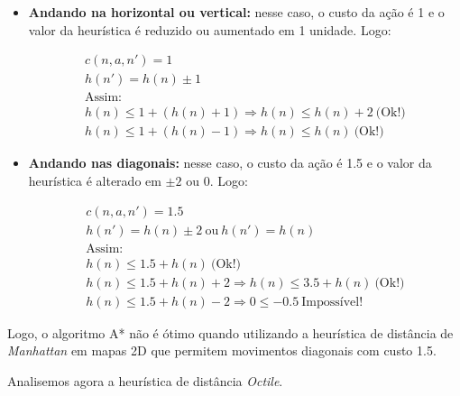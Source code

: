 \documentclass[12pt]{article}
\begin{document}
\begin{itemize}
	\item \textbf{Andando na horizontal ou vertical:} nesse caso, o custo da ação é 1 e o valor da heurística é reduzido ou aumentado em 1 unidade. Logo:

	\begin{align*}
		c(n, a, n') = 1 \\
		h(n') = h(n) \pm 1 \\
		\text{Assim:} \\
		h(n) \leq 1 + (h(n) + 1) \Rightarrow h(n) \leq h(n) + 2 ~ \text{(Ok!)} \\
		h(n) \leq 1 + (h(n) - 1) \Rightarrow h(n) \leq h(n) ~ \text{(Ok!)} 
	\end{align*}

	\item \textbf{Andando nas diagonais:} nesse caso, o custo da ação é 1.5 e o valor da heurística é alterado em $ \pm 2 $ ou $ 0 $. Logo:

	\begin{align*}
		c(n, a, n') = 1.5 \\
		h(n') = h(n) \pm 2 ~ \text{ou} ~ h(n') = h(n) \\
		\text{Assim:} \\
		h(n) \leq 1.5 + h(n) ~ \text{(Ok!)} \\
		h(n) \leq 1.5 + h(n) + 2 \Rightarrow h(n) \leq 3.5 + h(n) ~ \text{(Ok!)} \\
		h(n) \leq 1.5 + h(n) - 2 \Rightarrow 0 \leq -0.5 ~ \text{Impossível!}
	\end{align*}
\end{itemize}

Logo, o algoritmo A* não é ótimo quando utilizando a heurística de distância de \textit{Manhattan} em mapas 2D que permitem movimentos diagonais com custo 1.5.

Analisemos agora a heurística de distância \textit{Octile}.
\end{document}
